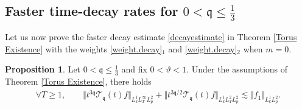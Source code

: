 \documentclass[reqno]{amsart}
\newcommand{\pv}{p}
\def\norm#1{\big\Vert#1\big\Vert}
\newcommand{\qq}{\mathfrak{q}}
\newcommand{\tTq}{t^{3\qq}}
\newcommand{\tc}{\vartheta}
\newcommand{\tw}{\mathcal{T}_{\qq}}
\theoremstyle{definition}
\newtheorem{proposition}[theorem]{Proposition}
\numberwithin{equation}{section}
\numberwithin{theorem}{section}
\begin{document}
\subsection{Faster time-decay rates for \texorpdfstring{$0 < \qq \leq \frac{1}{3}$}{}} \label{subfastdecay}


Let us now prove the faster decay estimate \eqref{decayestimate} in Theorem \ref{Torus Existence} with the weights \eqref{weight.decay}$_1$ and \eqref{weight.decay}$_2$ when $m=0$.

\begin{proposition}
    Let $0 < \qq \leq \frac{1}{3}$ and fix $0<\tc<1$. Under the assumptions of Theorem \ref{Torus Existence}, there holds \begin{align}\label{estimated.nonlin.second}
          \forall T\geq 1,\qquad   {\Vert{\tTq \tw(t) f}\Vert_{L^1_kL^\infty_TL^2_{\pv}}}
+
{\norm{t^{3\qq/2} \tw(t) f}_{L^1_kL^2_TL^2_{\pv}}}
\lesssim
\norm{ {f}_1}_{L^1_kL^2_{\pv}}.
\end{align}
\end{proposition}
\end{document}
